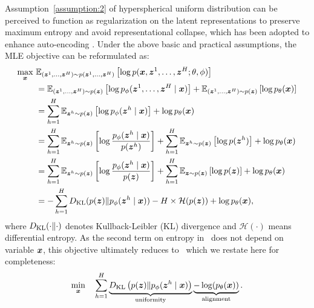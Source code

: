 Assumption~\ref{assumption:2} of hyperspherical uniform distribution can be perceived to function as regularization on the latent representations to preserve maximum entropy and avoid representational collapse, which has been adopted to enhance auto-encoding \citep{xu-durrett-2018-spherical,s-vae18}. Under the above basic and practical assumptions, the MLE objective can be reformulated as:
\begin{align}
\label{eq:mle reformulation}
    \max_{{\bm{x}}}~& \mathbb{E}_{({\bm{z}}^1, \dots,{\bm{z}}^H)\sim p({\bm{z}}^1,\dots,{\bm{z}}^H)}\left[\log p({\bm{x}},{\bm{z}}^1,\dots,{\bm{z}}^H; \theta,\phi)\right] \nonumber \\
    & = \mathbb{E}_{({\bm{z}}^1,\dots,{\bm{z}}^H) \sim p({\bm{z}})}\left[ \log p_\phi({\bm{z}}^1,\dots,{\bm{z}}^H \mid {\bm{x}})\right] + \mathbb{E}_{({\bm{z}}^1,\dots,{\bm{z}}^H) \sim p({\bm{z}})} \left[\log p_\theta({\bm{x}}) \right]  \nonumber\\
    & = \sum_{h=1}^H \mathbb{E}_{{\bm{z}}^h \sim p({\bm{z}})} \left[\log p_\phi({\bm{z}}^h \mid {\bm{x}}) \right] + \log p_\theta({\bm{x}}) \nonumber \\
    & = \sum_{h=1}^H \mathbb{E}_{{\bm{z}}^h \sim p({\bm{z}})} \left[\log \frac{p_\phi({\bm{z}}^h \mid {\bm{x}})}{p({\bm{z}}^h)} \right] + \sum_{h=1}^H \mathbb{E}_{{\bm{z}}^h \sim p({\bm{z}})} \left[\log  p({\bm{z}}^h) \right] + \log p_\theta({\bm{x}}) \nonumber \\
    & = \sum_{h=1}^H \mathbb{E}_{{\bm{z}}^h \sim p({\bm{z}})} \left[\log \frac{p_\phi({\bm{z}}^h \mid {\bm{x}})}{p({\bm{z}})} \right] + \sum_{h=1}^H \mathbb{E}_{{\bm{z}} \sim p({\bm{z}})} \left[\log p({\bm{z}}) \right] + \log p_\theta({\bm{x}}) \nonumber \\
    & = -\sum_{h=1}^H D_{\mathrm{KL}}( p({\bm{z}}) \Vert p_\phi({\bm{z}}^h \mid {\bm{x}}) ) - H \times \mathcal{H}(p({\bm{z}})) +  \log p_\theta({\bm{x}}), 
\end{align}
where $D_{\mathrm{KL}}(\cdot \Vert \cdot)$ denotes Kullback-Leibler (KL) divergence and $\mathcal{H}(\cdot)$ means differential entropy. As the second term on entropy in~ does not depend on variable ${\bm{x}}$, this objective ultimately reduces to~ which we restate here for completeness:
\begin{equation*}
\min_{{\bm{x}}} \quad \sum_{h=1}^H \underbrace{D_{\mathrm{KL}} \left( p({\bm{z}}) \Vert p_\phi({\bm{z}}^h \mid {\bm{x}}) \right)}_{\text{uniformity}} \underbrace{- \log(p_\theta({\bm{x}}))}_{\text{alignment}}.
\end{equation*}

